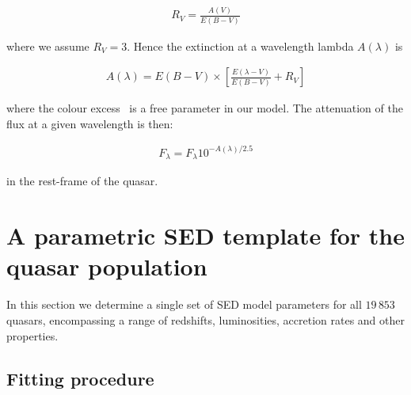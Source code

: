 \begingroup\makeatletter{}\check@mathfonts
\begin{eqnarray}
  R_V = \frac{A(V)}{E(B-V)}
\end{eqnarray}
\endgroup

\noindent where we assume $R_V = 3$. 
Hence the extinction at a wavelength lambda $A(\lambda)$ is 

\begingroup\makeatletter{}\check@mathfonts
\begin{eqnarray}
  A(\lambda) = E(B-V) \times \left[ \frac{E(\lambda-V)}{E(B-V)} + R_V \right] 
\end{eqnarray}
\endgroup

\noindent where the colour excess \ebv\, is a free parameter in our model. 
The attenuation of the flux at a given wavelength is then:

\begingroup\makeatletter{}\check@mathfonts
\begin{eqnarray}
  F_\lambda = F_\lambda10^{-A(\lambda)/2.5}
\end{eqnarray}
\endgroup

\noindent in the rest-frame of the quasar. 

\section{A parametric SED template for the quasar population} 
\label{sec:ch5-standardmodel}

In this section we determine a single set of SED model parameters for all $19\,853$ quasars, encompassing a range of redshifts, luminosities, accretion rates and other properties. 

\subsection{Fitting procedure}

